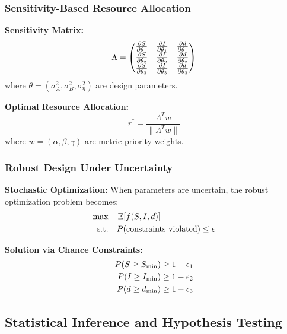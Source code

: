 \subsubsection{Sensitivity-Based Resource Allocation}

\textbf{Sensitivity Matrix:}
\begin{equation}
\Lambda = \begin{pmatrix}
\frac{\partial S}{\partial \theta_1} & \frac{\partial I}{\partial \theta_1} & \frac{\partial d}{\partial \theta_1} \\
\frac{\partial S}{\partial \theta_2} & \frac{\partial I}{\partial \theta_2} & \frac{\partial d}{\partial \theta_2} \\
\frac{\partial S}{\partial \theta_3} & \frac{\partial I}{\partial \theta_3} & \frac{\partial d}{\partial \theta_3}
\end{pmatrix}
\end{equation}
where $\theta = (\sigma_A^2, \sigma_B^2, \sigma_\eta^2)$ are design parameters.

\textbf{Optimal Resource Allocation:}
\begin{equation}
r^* = \frac{\Lambda^T w}{\|\Lambda^T w\|}
\end{equation}
where $w = (\alpha, \beta, \gamma)$ are metric priority weights.

\subsubsection{Robust Design Under Uncertainty}

\textbf{Stochastic Optimization:}
When parameters are uncertain, the robust optimization problem becomes:
\begin{align}
\max \quad & \operatorname{\mathbb{E}}[f(S, I, d)] \\
\text{s.t.} \quad & P(\text{constraints violated}) \leq \epsilon
\end{align}

\textbf{Solution via Chance Constraints:}
\begin{align}
P(S \geq S_{\min}) &\geq 1 - \epsilon_1 \\
P(I \geq I_{\min}) &\geq 1 - \epsilon_2 \\
P(d \geq d_{\min}) &\geq 1 - \epsilon_3
\end{align}

\subsection{Statistical Inference and Hypothesis Testing}

